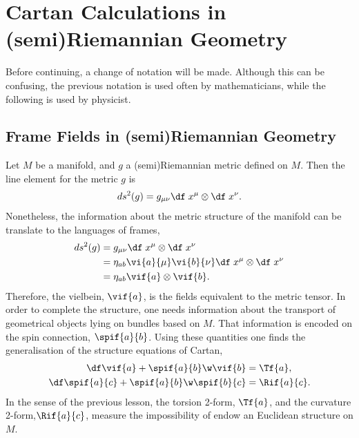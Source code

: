 
\chapter{Cartan Calculations in (semi)Riemannian Geometry}

Before continuing, a change of notation will be made. Although this can be confusing, the previous notation is used often by mathematicians, while the following is used by physicist.

\section{Frame Fields in (semi)Riemannian Geometry}


Let $M$ be a manifold, and $g$ a (semi)Riemannian metric defined on $M$. Then the line element for the metric $g$ is
\begin{align}
  ds^2(g) = g_{\mu\nu}\df\; x^\mu \otimes\df\; x^\nu.
\end{align}
Nonetheless, the information about the metric structure of the manifold can be translate to the languages of frames,
\begin{align}
  ds^2(g) &= g_{\mu\nu}\df\; x^\mu \otimes\df\; x^\nu\\
  &= \eta_{ab} \vi{a}{\mu}\vi{b}{\nu}\df\; x^\mu \otimes\df\; x^\nu\\
  &=\eta_{ab}\vif{a}\otimes\vif{b}.
\end{align}
Therefore, the vielbein, $\vif{a}$, is the fields equivalent to the metric tensor. In order to complete the structure, one needs information about the transport of geometrical objects lying on bundles based on $M$. That information is encoded on the spin connection, $\spif{a}{b}$. Using these quantities one finds  the generalisation of the structure equations of Cartan,
\begin{align}
  \df\vif{a} +\spif{a}{b}\w\vif{b} &= \Tf{a},\label{firstSE}\\
  \df\spif{a}{c}+\spif{a}{b}\w\spif{b}{c} &= \Rif{a}{c}\label{secondSE}.
\end{align}
In the sense of the previous lesson, the torsion 2-form, $\Tf{a}$, and the curvature 2-form,$\Rif{a}{c}$, measure the impossibility of endow an Euclidean structure on $M$.

